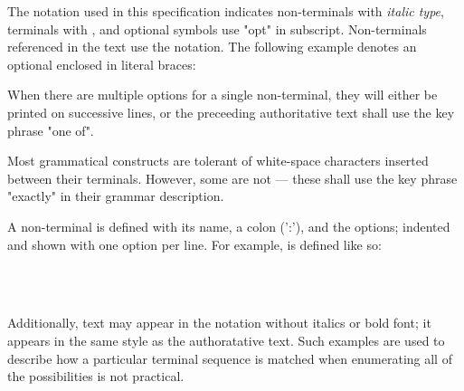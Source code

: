


\specsubitem
The notation used in this specification indicates non-terminals with
\textit{italic type}, terminals with , and optional
symbols use "opt" in subscript. Non-terminals referenced in the text use the
 notation. The following example denotes an optional
 enclosed in literal braces:

\begin{grammar}
\terminal{\{}  \terminal{\}}
\end{grammar}

\specsubitem
When there are multiple options for a single non-terminal, they will either be
printed on successive lines, or the preceeding authoritative text shall use the
key phrase "one of".

\specsubitem
Most grammatical constructs are tolerant of white-space characters inserted
between their terminals. However, some are not --- these shall use the key
phrase "exactly" in their grammar description.

\specsubitem
A non-terminal is defined with its name, a colon (':'), and the options;
indented and shown with one option per line. For example,
 is defined like so:

\begin{grammar}
\\
	 \optional{\terminal{,}}\\
	 \terminal{,} 
\end{grammar}

\specsubitem
Additionally, text may appear in the notation without italics or bold font; it
appears in the same style as the authoratative text. Such examples are used to
describe how a particular terminal sequence is matched when enumerating all of
the possibilities is not practical.

\begin{grammar}
 \\
\end{grammar}







